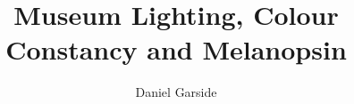 
\title{Museum Lighting, Colour Constancy and Melanopsin}
\author{Daniel Garside}

\maketitle
\makedeclaration

